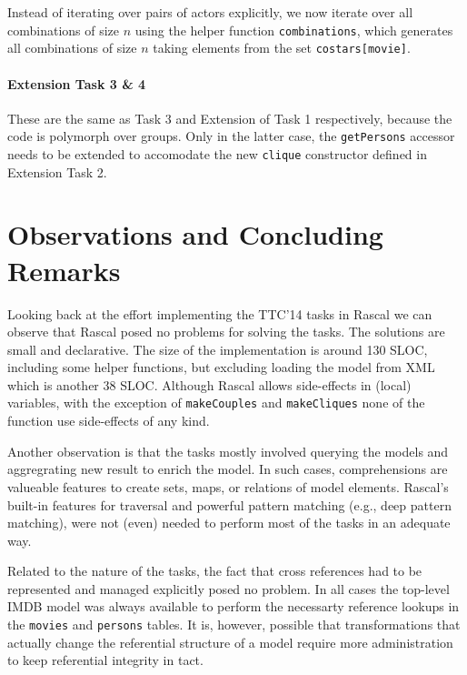 \documentclass[submission,copyright,creativecommons]{eptcs}
\begin{document}
Instead of iterating over pairs of actors explicitly, we now iterate over all combinations of size $n$ using the helper function \texttt{combinations}, which generates all combinations of size $n$ taking elements from the set \texttt{costars[movie]}. 

\paragraph{Extension Task 3 \& 4}

These are the same as Task 3 and Extension of Task 1 respectively,
because the code is polymorph over groups. Only in the latter case, the \texttt{getPersons} accessor needs to be extended to accomodate the new \texttt{clique} constructor defined in Extension Task 2. 

\section*{Observations and Concluding Remarks}


Looking back at the effort implementing the TTC'14 tasks in Rascal we can observe that Rascal posed no problems for solving the tasks. The solutions are small and declarative.  The size of the
implementation is around 130 SLOC, including some helper functions,
but excluding loading the model from XML which is another 38 SLOC. Although Rascal allows side-effects in (local) variables, with the exception of \texttt{makeCouples} and \texttt{makeCliques} none of the function use side-effects of any kind. 

Another observation is that the tasks mostly involved querying the models and aggregrating new result to enrich the model. In such cases, comprehensions are valueable features to create sets, maps, or relations of model elements.  Rascal's built-in features for traversal and powerful pattern matching (e.g., deep pattern matching), were not (even) needed to perform most of the tasks in an adequate way.

Related to the nature of the tasks, the fact that cross references had to be represented and managed explicitly posed no problem. In all cases the top-level IMDB model was always available to perform the necessarty reference lookups in the \texttt{movies} and \texttt{persons} tables. 
It is, however, possible that  transformations that actually change the referential structure of a model require more administration to keep referential integrity in tact.
\end{document}
